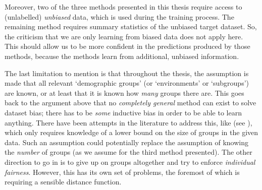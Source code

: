 Moreover, two of the three methods presented in this thesis require access to (unlabelled) \emph{unbiased} data,
which is used during the training process.
The remaining method requires summary statistics of the unbiased target dataset.
So, the criticism that we are only learning from biased data does not apply here.
This should allow us to be more confident in the predictions produced by those methods,
because the methods learn from additional, unbiased information.

The last limitation to mention is that throughout the thesis,
the assumption is made that all relevant `demographic groups' (or `environments' or `subgroups')
are known, or at least that it is known how \emph{many} groups there are.
This goes back to the argument above that no \emph{completely general} method can exist to solve dataset bias;
there has to be \emph{some} inductive bias in order to be able to learn anything.
There have been attempts in the literature to address this,
like \citet{HasSriNamLia18} (see ),
which only requires knowledge of a lower bound on the size of groups in the given data.
Such an assumption could potentially replace the assumption of knowing the \emph{number} of groups
(as we assume for the third method presented).
The other direction to go in is to give up on groups altogether and try to enforce \emph{individual fairness}.
However, this has its own set of problems,
the foremost of which is requiring a sensible distance function.

